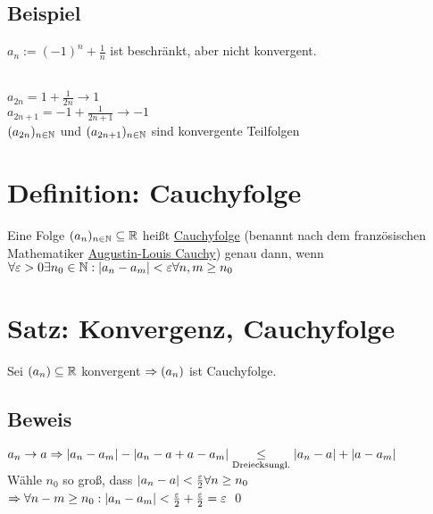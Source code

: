 \fancyhead[R]{}
\subsection*{Beispiel}
$a_n := (-1)^n + \frac{1}{n}$ ist beschränkt, aber nicht konvergent.\\
\\
$a_{2n} = 1 + \frac{1}{2n} \to 1$\\
$a_{2n+1} = -1 + \frac{1}{2n+1} \to -1$\\
$(a_{2n})_{n \in \mathbb{N}}$ und $(a_{2n+1})_{n \in \mathbb{N}}$ sind konvergente Teilfolgen

\section{Definition: Cauchyfolge}\label{5.13}
Eine Folge $(a_n)_{n \in \mathbb{N}} \subseteq \mathbb{R}$ heißt \underline{Cauchyfolge} (benannt nach dem französischen Mathematiker \href{https://de.wikipedia.org/wiki/Augustin-Louis_Cauchy}{Augustin-Louis Cauchy}) genau dann, wenn $\forall \varepsilon > 0 \exists n_0 \in \mathbb{N}: |a_n-a_m| < \varepsilon \forall n,m \ge n_0$

\section{Satz: Konvergenz, Cauchyfolge}\label{5.14}
Sei $(a_n) \subseteq \mathbb{R}$ konvergent $\Rightarrow (a_n)$ ist Cauchyfolge.

\subsection*{Beweis}
$a_n \to a \Rightarrow |a_n-a_m| - |a_n-a+a-a_m| \underset{\text{Dreiecksungl.}}{\le} |a_n-a| + |a-a_m|$\\
Wähle $n_0$ so groß, dass $|a_n-a| < \frac{\varepsilon}{2} \forall n \ge n_0$\\
$\Rightarrow \forall n-m \ge n_0: |a_n-a_m| < \frac{\varepsilon}{2} + \frac{\varepsilon}{2} = \varepsilon$ \qed

